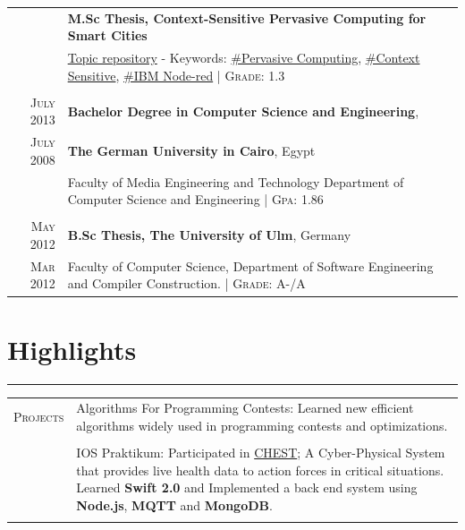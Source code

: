 \documentclass[a4paper,13pt]{article}
\begin{document}
\begin{adjustwidth}{-3cm}{}
\begin{tabular}{r|p{17.5cm}}
\textsc{}&
\textbf{M.Sc Thesis, Context-Sensitive Pervasive Computing for Smart Cities}\\
& \href{https://github.com/SalehAly/master-thesis}{Topic repository} - Keywords: \href{https://www.google.de/search?q=Pervasive+Computing}{\#Pervasive Computing}, \href{https://www.google.de/search?q=context+sensitive}{\#Context Sensitive}, \href{nodered.org}{\#IBM Node-red} 
\footnotesize \hfill| \normalsize \textsc{Grade}: 1.3
\\ \multicolumn{2}{c}{} \\


\textsc{July} 2013 & \textbf{Bachelor Degree in Computer Science and Engineering},\\ \textsc{July} 2008& \normalsize\textbf{The German University in Cairo}, Egypt\\
& \small{Faculty of Media Engineering and Technology} \small{Department of Computer Science and Engineering}  \footnotesize \hfill| \normalsize \textsc{Gpa}: 1.86
\\\multicolumn{2}{c}{} \\

\textsc{May} 2012 & \textbf{B.Sc Thesis, The University of Ulm}, Germany\\
\textsc{Mar} 2012 & \small{Faculty of Computer Science, Department of Software Engineering and} \small{Compiler Construction.} 
 \hfill| \footnotesize \normalsize \textsc{Grade}: A-/A 
\\
\end{tabular}





\section{Highlights} \label{praktikum}
\rule[0pt]{20cm}{0.5pt}

\begin{tabular}{r|p{17.5cm}}
	\textsc{Projects} &Algorithms For Programming Contests: Learned new efficient algorithms widely used in programming contests and optimizations. 
	\\\multicolumn{1}{c}{} \\
	&IOS Praktikum: Participated in \href{https://www1.in.tum.de/lehrstuhl_1/component/content/article/733#CHEST}{CHEST}; A Cyber-Physical System that provides live health data to action forces in critical situations. Learned \textbf{Swift 2.0} and Implemented a back end system using \textbf{Node.js}, \textbf{MQTT} and \textbf{MongoDB}. \\\multicolumn{1}{c}{} \\
	

\end{tabular}
\end{adjustwidth}
\end{document}
